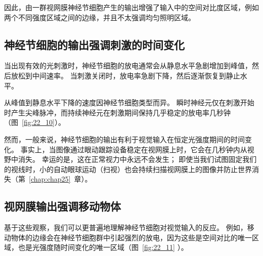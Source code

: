因此，由一群视网膜神经节细胞产生的输出增强了输入中的空间对比度区域，例如两个不同强度区域之间的边缘，并且不太强调均匀照明区域。



\subsection{神经节细胞的输出强调刺激的时间变化}

当出现有效的光刺激时，神经节细胞的放电通常会从静息水平急剧增加到峰值，然后放松到中间速率。
当刺激关闭时，放电率急剧下降，然后逐渐恢复到静止水平。


从峰值到静息水平下降的速度因神经节细胞类型而异。
瞬时神经元仅在刺激开始时产生尖峰脉冲，而持续神经元在刺激期间保持几乎稳定的放电率几秒钟（图~\ref{fig:22_10}）。


然而，一般来说，神经节细胞的输出有利于视觉输入在恒定光强度期间的时间变化。
事实上，当图像通过眼动跟踪设备稳定在视网膜上时，它会在几秒钟内从视野中消失。
幸运的是，这在正常视力中永远不会发生；
即使当我们试图固定我们的视线时，小的自动眼球运动（扫视）也会持续扫描视网膜上的图像并防止世界消失（第~\ref{chap:chap25}~章）。



\subsection{视网膜输出强调移动物体}

基于这些观察，我们可以更普遍地理解神经节细胞对视觉输入的反应。
例如，移动物体的边缘会在神经节细胞群中引起强烈的放电，因为这些是空间对比的唯一区域，也是光强度随时间变化的唯一区域（图~\ref{fig:22_11} ）。


